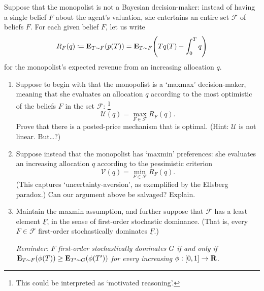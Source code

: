 \begin{exercise}
	\label{exercise:ambiguity}
	Suppose that the monopolist is not a Bayesian decision-maker:
	instead of having a single belief $F$ about the agent's valuation,
	she entertains an entire set $\mathcal{F}$ of beliefs $F$.
	For each given belief $F$, let us write
	\begin{equation*}
		R_F(q) \coloneqq \E_{T \sim F}( p(T) )
		= \E_{T \sim F}\left( T q(T) - \int_0^T q \right)
	\end{equation*}
	for the monopolist's expected revenue from an increasing allocation $q$.

	\begin{enumerate}[label=(\alph*)]
	
		\item
		Suppose to begin with that the monopolist is a `maxmax' decision-maker, meaning that she evaluates an allocation $q$ according to the most optimistic of the beliefs $F$ in the set $\mathcal{F}$:%
			\footnote{This could be interpreted as `motivated reasoning'.}
		\begin{equation*}
			\mathcal{U}(q) = \max_{F \in \mathcal{F}} R_F(q) .
		\end{equation*}
		Prove that there is a posted-price mechanism that is optimal.
		(Hint: $\mathcal{U}$ is not linear. But\dots?)

		\item
		Suppose instead that the monopolist has `maxmin' preferences:
		she evaluates an increasing allocation $q$ according to the pessimistic criterion
		\begin{equation*}
			\mathcal{V}(q) = \min_{F \in \mathcal{F}} R_F(q) .
		\end{equation*}
		(This captures `uncertainty-aversion', as exemplified by the Ellsberg paradox.)
		Can our argument above be salvaged? Explain.

		\item
		Maintain the maxmin assumption,
		and further suppose that $\mathcal{F}$ has a least element $\underline{F}$, in the sense of first-order stochastic dominance.
		(That is, every $F \in \mathcal{F}$ first-order stochastically dominates $\underline{F}$.)

		\emph{Reminder: $F$ first-order stochastically dominates $G$
		if and only if $\mathbf{E}_{T \sim F}( \phi(T) ) \geq \mathbf{E}_{T' \sim G}( \phi(T') )$ for every increasing $\phi : [0,1] \to \mathbf{R}$.}

		\begin{enumerate}[label=(\roman*)]
		

\end{enumerate}
\end{enumerate}
\end{exercise}
